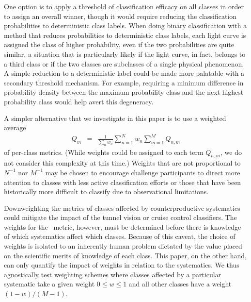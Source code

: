One option is to apply a threshold of classification efficacy on all classes in order to assign an overall winner, though it would require reducing the classification probabilities to deterministic class labels.
When doing binary classification with a method that reduces probabilities to deterministic class labels, each light curve is assigned the class of higher probability, even if the two probabilities are quite similar, a situation that is particularly likely if the light curve, in fact, belongs to a third class or if the two classes are subclasses of a single physical phenomenon.
A simple reduction to a deterministic label could be made more palatable with a secondary threshold mechanism.
For example, requiring a minimum difference in probability density between the maximum probability class and the next highest probability class would help avert this degeneracy.

A simpler alternative that we investigate in this paper is to use a weighted average
\begin{eqnarray}
  \label{eq:weightavg}
  Q_{m} &=& \frac{1}{\sum_{n} w_{n}} \sum_{n=1}^{N} w_{n} \sum_{m=1}^{M} Q_{n, m}
\end{eqnarray}
of per-class metrics.
(While weights could be assigned to each term $Q_{n, m}$, we do not consider this complexity at this time.)
Weights that are not proportional to $N^{-1}$ nor $M^{-1}$ may be chosen to encourage challenge participants to direct more attention to classes with less active classification efforts or those that have been historically more difficult to classify due to observational limitations.

Downweighting the metrics of classes affected by counterproductive systematics could mitigate the impact of the tunnel vision or cruise control classifiers.
The weights for the \plasticc\ metric, however, must be determined before there is knowledge of which systematics affect which classes.
Because of this caveat, the choice of weights is isolated to an inherently human problem dictated by the value placed on the scientific merits of knowledge of each class.
This paper, on the other hand, can only quantify the impact of weights in relation to the systematics.
We thus agnostically test weighting schemes where classes affected by a particular systematic take a given weight $0 \leq w \leq 1$ and all other classes have a weight $(1 - w) / (M - 1)$.
